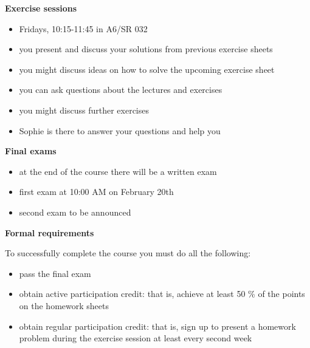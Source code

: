 \documentclass[11pt]{amsart}%
\begin{document}
\medskip
\noindent
\textbf{Exercise sessions}
\begin{itemize}
 \item Fridays, 10:15-11:45 in A6/SR 032
 \item you present and discuss your solutions from previous exercise sheets
 \item you might discuss ideas on how to solve the upcoming exercise sheet
 \item you can ask questions about the lectures and exercises
 \item you might discuss further exercises
 \item {\footnotesize Sophie is there to answer your questions and help you}
\end{itemize}


\textbf{Final exams}
\begin{itemize}
	\item at the end of the course there will be a written exam
	\item first exam at 10:00 AM on February 20th
	\item second exam to be announced 
\end{itemize}

\textbf{Formal requirements}

To successfully complete the course you must do all the following:
\begin{itemize}
	\item pass the final exam
	 \item obtain active participation credit: that is, achieve at least 50 \% of the points on the homework sheets
	\item obtain regular participation credit: that is, sign up  to present a homework problem during the exercise session at least every second week
\end{itemize}
\end{document}
